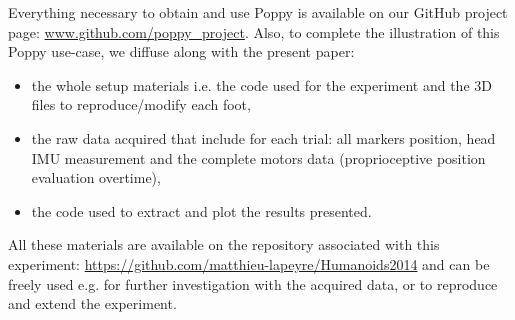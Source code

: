 Everything necessary to obtain and use Poppy is available on our GitHub project page: \url{www.github.com/poppy_project}. Also, to complete the illustration of this Poppy use-case, we diffuse along with the present paper:
\begin{itemize}
     \item the whole setup materials i.e. the code used for the experiment and the 3D files to reproduce/modify each foot,
     \item the raw data acquired that include for each trial: all markers position, head IMU measurement and the complete motors data (proprioceptive position evaluation overtime),
     \item the code used to extract and plot the results presented.
\end{itemize}

All these materials are available on the repository associated with this experiment: \url{https://github.com/matthieu-lapeyre/Humanoids2014} and can be freely used e.g. for further investigation with the acquired data, or to reproduce and extend the experiment.

